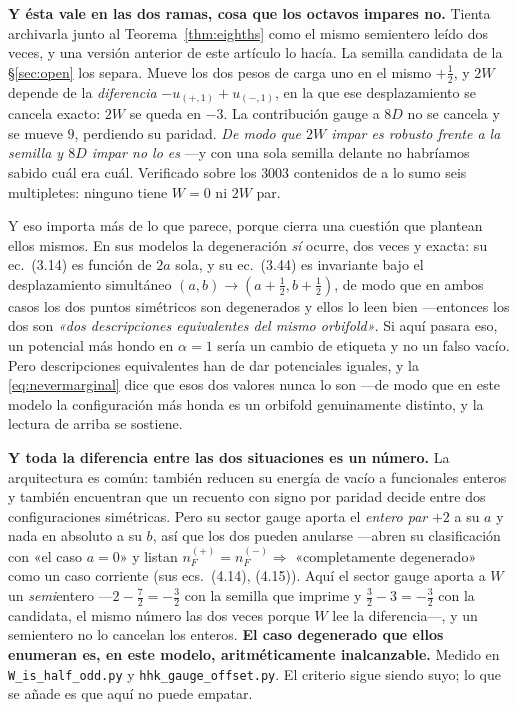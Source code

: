 \documentclass[11pt,a4paper]{article}
\begin{document}
\noindent \textbf{Y ésta vale en las dos ramas, cosa que los octavos impares no.} Tienta
archivarla junto al Teorema~\ref{thm:eighths} como el mismo semientero leído dos veces, y una
versión anterior de este artículo lo hacía. La semilla candidata de la \S\ref{sec:open} los separa.
Mueve los dos pesos de carga uno en el mismo $+\tfrac12$, y $2W$ depende de la \emph{diferencia}
$-u_{(+,1)}+u_{(-,1)}$, en la que ese desplazamiento se cancela exacto: $2W$ se queda en $-3$. La
contribución gauge a $8D$ no se cancela y se mueve $9$, perdiendo su paridad. \emph{De modo que
$2W$ impar es robusto frente a la semilla y $8D$ impar no lo es} ---y con una sola semilla delante
no habríamos sabido cuál era cuál. Verificado sobre los
$3003$ contenidos de a lo sumo seis multipletes: ninguno tiene $W=0$ ni $2W$ par.

Y eso importa más de lo que parece, porque cierra una cuestión que \cite{CCD24} plantean ellos
mismos. En sus
modelos la degeneración \emph{sí} ocurre, dos veces y exacta: su ec.~(3.14) es función de $2a$ sola,
y su ec.~(3.44) es invariante bajo el desplazamiento simultáneo
$(a,b)\to(a+\tfrac12,b+\tfrac12)$, de modo que en ambos casos los dos puntos simétricos son
degenerados y ellos lo leen bien ---entonces los dos son \emph{«dos descripciones equivalentes del
mismo orbifold»}. Si aquí pasara eso, un potencial más hondo en $\alpha=1$ sería un cambio de
etiqueta y no un falso vacío. Pero descripciones equivalentes han de dar potenciales iguales, y la
\eqref{eq:nevermarginal} dice que esos dos valores nunca lo son ---de modo que en este modelo la
configuración más honda es un orbifold genuinamente distinto, y la lectura de arriba se sostiene.

\noindent \textbf{Y toda la diferencia entre las dos situaciones es un número.} La arquitectura es
común: \cite{HHK03} también reducen su energía de vacío a funcionales enteros y también encuentran
que un recuento con signo por paridad decide entre dos configuraciones simétricas. Pero su sector
gauge aporta el \emph{entero par} $+2$ a su $a$ y nada en absoluto a su $b$, así que los dos pueden
anularse ---abren su clasificación con «el caso $a=0$» y listan
$n_F^{(+)}=n_F^{(-)}\Rightarrow$ «completamente degenerado» como un caso corriente (sus
ecs.~(4.14), (4.15)). Aquí el sector gauge aporta a $W$ un \emph{semi}entero ---$2-\tfrac72=-\tfrac32$ con la semilla
que imprime \cite{KM25} y $\tfrac32-3=-\tfrac32$ con la candidata, el mismo número las dos veces
porque $W$ lee la diferencia---, y un semientero no lo cancelan los enteros. \textbf{El caso degenerado que ellos enumeran es, en este modelo, aritméticamente
inalcanzable.} Medido en \texttt{W\_\allowbreak is\_\allowbreak half\_\allowbreak odd.py} y
\texttt{hhk\_\allowbreak gauge\_\allowbreak offset.py}. El criterio sigue siendo suyo; lo que se
añade es que aquí no puede empatar.
\end{document}
